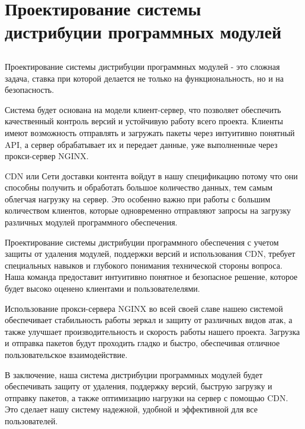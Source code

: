 \chapter{Проектирование системы дистрибуции программных модулей}
\label{cha:design}

\section{}

Проектирование системы дистрибуции программных модулей - это сложная задача, ставка при которой делается не только на функциональность, но и на безопасность. 

Система будет основана на модели клиент-сервер, что позволяет обеспечить качественный контроль версий и устойчивую работу всего проекта. Клиенты имеют возможность отправлять и загружать пакеты через интуитивно понятный API, а сервер обрабатывает их и передает данные, уже выполненные через прокси-сервер NGINX.

CDN или Сети доставки контента войдут в нашу спецификацию потому что они способны получить и обработать большое количество данных, тем самым облегчая нагрузку на сервер. Это особенно важно при работы с большим количеством клиентов, которые одновременно отправляют запросы на загрузку различных модулей программного обеспечения.

Проектирование системы дистрибуции программного обеспечения с учетом защиты от удаления модулей, поддержки версий и использования CDN, требует специальных навыков и глубокого понимания технической стороны вопроса. Наша команда предоставит интуитивно понятное и безопасное решение, которое будет высоко оценено клиентами и пользователелями.

Использование прокси-сервера NGINX во всей своей славе нашею системой обеспечивает стабильность работы зеркал и защиту от различных видов атак, а также улучшает производительность и скорость работы нашего проекта. Загрузка и отправка пакетов будут проходить гладко и быстро, обеспечивая отличное пользовательское взаимодействие.

В заключение, наша система дистрибуции программных модулей будет обеспечивать защиту от удаления, поддержку версий, быструю загрузку и отправку пакетов, а также оптимизацию нагрузки на сервер с помощью CDN. Это сделает нашу систему надежной, удобной и эффективной для все пользователей.

